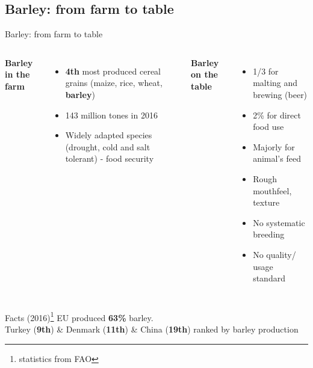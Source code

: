 \documentclass{beamer}
\begin{document}
\subsection{Barley: from farm to table}
\begin{frame}{Barley: from farm to table}

\begin{columns}[T]
\textbf{Barley in the farm}
\begin{itemize}
\item \textbf{4th} most produced cereal grains (maize, rice, wheat, \textbf{barley})
\item 143 million tones in 2016
\item Widely adapted species (drought, cold and salt tolerant) - food security
\end{itemize}
 
\textbf{Barley on the table}
\begin{itemize}
\item 1/3 for malting and brewing (beer)
\item 2\%  for direct food use
\item Majorly for animal's feed
\newline
\item Rough mouthfeel, texture
\item No systematic breeding
\item No quality/ usage standard
\end{itemize}
\end{columns}

\vskip 0.3cm

\begin{block}{Facts (2016)\footnote{statistics from FAO}}
EU produced \textbf{63\%} barley.\\Turkey (\textbf{9th}) \& Denmark (\textbf{11th})  \& China (\textbf{19th}) ranked by barley production 
\end{block}

\end{frame}
\end{document}
